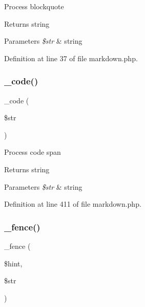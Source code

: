 Process blockquote \begin{DoxyReturn}{Returns}
string 
\end{DoxyReturn}

\begin{DoxyParams}{Parameters}
{\em \$str} & string \\
\hline
\end{DoxyParams}


Definition at line 37 of file markdown.\+php.

\hypertarget{class_markdown_a8cd84bea585e81d80e4dfb8836922e54}{}\label{class_markdown_a8cd84bea585e81d80e4dfb8836922e54} 
\subsubsection{\texorpdfstring{\+\_\+code()}{\_code()}}
{\footnotesize\ttfamily \+\_\+code (\begin{DoxyParamCaption}\item[{}]{\$str }\end{DoxyParamCaption})\hspace{0.3cm}{\ttfamily [protected]}}

Process code span \begin{DoxyReturn}{Returns}
string 
\end{DoxyReturn}

\begin{DoxyParams}{Parameters}
{\em \$str} & string \\
\hline
\end{DoxyParams}


Definition at line 411 of file markdown.\+php.

\hypertarget{class_markdown_a18b5eb148af09b928ec07484646f3131}{}\label{class_markdown_a18b5eb148af09b928ec07484646f3131} 
\subsubsection{\texorpdfstring{\+\_\+fence()}{\_fence()}}
{\footnotesize\ttfamily \+\_\+fence (\begin{DoxyParamCaption}\item[{}]{\$hint,  }\item[{}]{\$str }\end{DoxyParamCaption})\hspace{0.3cm}{\ttfamily [protected]}}

